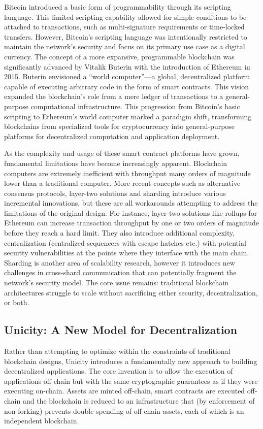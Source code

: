 \documentclass{article}
\begin{document}
Bitcoin introduced a basic form of programmability through its scripting language. This limited scripting capability allowed for simple conditions to be attached to transactions, such as multi-signature requirements or time-locked transfers. However, Bitcoin's scripting language was intentionally restricted to maintain the network's security and focus on its primary use case as a digital currency. The concept of a more expansive, programmable blockchain was significantly advanced by Vitalik Buterin with the introduction of Ethereum in 2015. Buterin envisioned a ``world computer''---a global, decentralized platform capable of executing arbitrary code in the form of smart contracts. This vision expanded the blockchain's role from a mere ledger of transactions to a general-purpose computational infrastructure. This progression from Bitcoin's basic scripting to Ethereum's world computer marked a paradigm shift, transforming blockchains from specialized tools for cryptocurrency into general-purpose platforms for decentralized computation and application deployment.

As the complexity and usage of these smart contract platforms have grown, fundamental limitations have become increasingly apparent. Blockchain computers are extremely inefficient with throughput many orders of magnitude lower than a traditional computer. More recent concepts such as alternative consensus protocols, layer-two solutions and sharding introduce various incremental innovations, but these are all workarounds attempting to address the limitations of the original design. For instance, layer-two solutions like rollups for Ethereum can increase transaction throughput by one or two orders of magnitude before they reach a hard limit. They also introduce additional complexity, centralization (centralized sequencers with escape hatches etc.) with potential security vulnerabilities at the points where they interface with the main chain. Sharding is another area of scalability research, however it introduces new challenges in cross-shard communication that can potentially fragment the network's security model. The core issue remains: traditional blockchain architectures struggle to scale without sacrificing either security, decentralization, or both.

\subsection{Unicity: A New Model for Decentralization}

Rather than attempting to optimize within the constraints of traditional blockchain designs, Unicity introduces a fundamentally new approach to building decentralized applications. The core invention is to allow the execution of applications off-chain but with the same cryptographic guarantees as if they were executing on-chain. Assets are minted off-chain, smart contracts are executed off-chain and the blockchain is reduced to an infrastructure that (by enforcement of non-forking) prevents double spending of off-chain assets, each of which is an independent blockchain.
\end{document}
